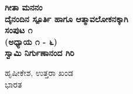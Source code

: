 \begin{titlepage}
    \begin{center}
        \vspace*{0.5cm}
            
        {\Huge
        \textbf{\color{blue}\fontsize{50}{60}\selectfont ಗೀತಾ ಮನನಂ}}
        \textbf{\\ \small \color{black}ದೈನಂದಿನ ಸ್ಪೂರ್ತಿ ಹಾಗೂ ಆತ್ಮಾವಲೋಕನಕ್ಕಾಗಿ}\\ 
		\vspace{1.0cm}
		\textbf{{\large \color{black} ಸಂಪುಟ ೧}\\{\normalsize \color{black} (ಅಧ್ಯಾಯ ೧ - ೬)}}\\		
        \vspace{6.0cm}
        \textbf{{\Large \color{blue}\mananamfont ಸ್ವಾಮಿ ನಿರ್ಗುಣಾನಂದ ಗಿರಿ}}\\    
        
		
            
        \vfill
            
        
            
        \vspace{0.1cm}
        {\color{black}    
		
		{{\large \color{blue}ಹೃಷೀಕೇಶ, ಉತ್ತರಾ ಖಂಡ}\\\normalsize ಭಾರತ}
        }
    \end{center}
\end{titlepage}
\nopagecolor%